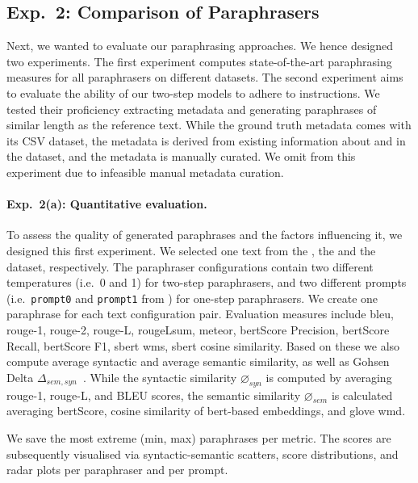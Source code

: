 \subsection{Exp.\ 2: Comparison of Paraphrasers}
\label{subsec:comp_paraphrasers_setup}

Next, we wanted to evaluate our paraphrasing approaches.
We hence designed two experiments.
The first experiment computes state-of-the-art paraphrasing measures for all paraphrasers on different datasets.
The second experiment aims to evaluate the ability of our two-step models to adhere to instructions.
We tested their proficiency extracting metadata and generating paraphrases of similar length as the reference text.
While the \dataBlog{} ground truth metadata comes with its CSV dataset, the \dataStudent{} metadata is derived from existing information about and in the dataset, and the \dataGutenberg{} metadata is manually curated.
We omit \dataPan{} from this experiment due to infeasible manual metadata curation.

\paragraph{Exp.\ 2(a): Quantitative evaluation.}

To assess the quality of generated paraphrases and the factors influencing it, we designed this first experiment.
We selected one text from the \dataBlog{}, the \dataGutenberg{} and the \dataStudent{} dataset, respectively.
The paraphraser configurations contain two different temperatures (i.e.\ 0 and 1) for two-step paraphrasers, and two different prompts (i.e.\ \texttt{prompt0} and \texttt{prompt1} from ) for one-step paraphrasers.
We create one paraphrase for each text configuration pair.
Evaluation measures include \ac{bleu}, \ac{rouge}-1, \ac{rouge}-2, \ac{rouge}-L, \ac{rouge}\-Lsum, \ac{meteor}, \ac{bert}\-Score Precision, \ac{bert}\-Score Recall, \ac{bert}\-Score F1, \ac{sbert} \ac{wms}, \ac{sbert} cosine similarity.
Based on these we also compute average syntactic and average semantic similarity, as well as Gohsen Delta $\Delta_{sem,syn}$~\citep{gohsen_captions_2023}.
While the syntactic similarity $\diameter_{syn}$ is computed by averaging \ac{rouge}-1, \ac{rouge}-L, and BLEU scores, the semantic similarity $\diameter_{sem}$ is calculated averaging \ac{bert}Score, cosine similarity of \ac{bert}-based embeddings, and \acs{glove} \ac{wmd}. 

We save the most extreme (min, max) paraphrases per metric.
The scores are subsequently visualised via syntactic-semantic scatters, score distributions, and radar plots per paraphraser and per prompt. 

